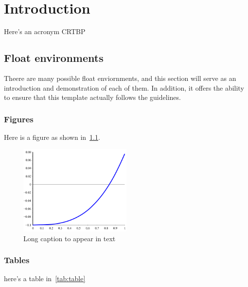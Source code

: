 
\chapter{Introduction} \label{chap:intro}
\lipsum[1]

\lipsum[2]

Here's an acronym \ac{CRTBP}
\section{Float environments}
Theere are many possible float enviornments, and this section will serve as an introduction and demonstration of each of them.
In addition, it offers the ability to ensure that this template actually follows the guidelines.

\lipsum

\subsection{Figures}\label{ssec:figures}
\lipsum

Here is a figure as shown in~\cref{fig:plain}.

\begin{figure}
    \centering
    \includegraphics[width=0.5\textwidth]{figures/f1_plain.pdf}
    \caption[Short caption for TOC]{Long caption to appear in text\label{fig:plain}}
\end{figure}

\lipsum
\subsection{Tables}\label{ssec:tables}
\lipsum

here's a table in~\cref{tab:table}

